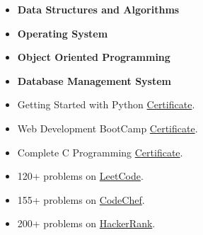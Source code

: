 \smallskip
\begin{itemize}
\item \textbf{Data Structures and Algorithms}
\item \textbf{Operating System}
\item \textbf{Object Oriented Programming}
\item \textbf{Database Management System}
\smallskip
\end{itemize}

\smallskip
\begin{itemize} 
\item Getting Started with Python {\href{https://drive.google.com/file/d/1cTRqy5XFujC--gmMM9N7TkpbEfW6RkXt/view?usp=sharing}{Certificate}}.
\item Web Development BootCamp {\href{https://drive.google.com/file/d/1B2txTZKae1B8sjkOzx-O7cFcZN5d6C0A/view?usp=sharing}{Certificate}}.
\item Complete C Programming {\href{https://drive.google.com/file/d/1nK71dR9qXCTjdTeft0cSSbAa8Y0-TG4q/view?usp=sharing}{Certificate}}.
\smallskip
\\
\end{itemize}

\smallskip
\begin{itemize} 
\item 120+ problems on {\href{https://leetcode.com/Tanmay_7/}{LeetCode}}.
\item 155+ problems on {\href{https://www.codechef.com/users/ts5975}{CodeChef}}.
\item 200+ problems on {\href{https://www.hackerrank.com/TanmayShukla07}{HackerRank}}.
\smallskip
\\
\end{itemize}
\cvproject{}
 


